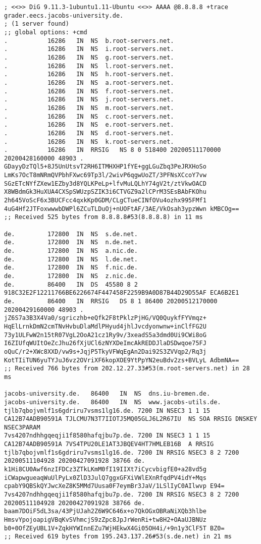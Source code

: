 \documentclass[a4paper]{article}
\begin{document}
\begin{verbatim}
; <<>> DiG 9.11.3-1ubuntu1.11-Ubuntu <<>> AAAA @8.8.8.8 +trace grader.eecs.jacobs-university.de.
; (1 server found)
;; global options: +cmd
.			16286	IN	NS	b.root-servers.net.
.			16286	IN	NS	i.root-servers.net.
.			16286	IN	NS	g.root-servers.net.
.			16286	IN	NS	l.root-servers.net.
.			16286	IN	NS	h.root-servers.net.
.			16286	IN	NS	a.root-servers.net.
.			16286	IN	NS	f.root-servers.net.
.			16286	IN	NS	j.root-servers.net.
.			16286	IN	NS	m.root-servers.net.
.			16286	IN	NS	c.root-servers.net.
.			16286	IN	NS	e.root-servers.net.
.			16286	IN	NS	d.root-servers.net.
.			16286	IN	NS	k.root-servers.net.
.			16286	IN	RRSIG	NS 8 0 518400 20200511170000 20200428160000 48903 . GDayyDzTQl5+8J5UnUtsvT2RH6ITMHXHP1fYE+ggLGuZbq3PeJRXHoSo LmKs7OcT8mNRmQVPbhFXwc69Tp3l/2wivP6qgwUoZT/3PFNsXCcoY7vw SGzETcNYfZXew1EZby3d8YQLKPeLp+lfvMuLQLhY74gV2t/ztVkwOACD X8WBdmGk3HuXUA4CXSpSWUzpSZIK3i6CTVGZ9a2lCPrM3SEsBAbFKOhu 2h645VoScF6x3BUCFcc4qxkKp0GDM/CLgCTueCINfOVu4ozhx995FMf1 4uG4Hf2JTFoxwwwbDWPl6ZCuTLDuOj+nUOFtAF/3AE/VkOsah3ypzWwn kMBCOg==
;; Received 525 bytes from 8.8.8.8#53(8.8.8.8) in 11 ms

de.			172800	IN	NS	s.de.net.
de.			172800	IN	NS	n.de.net.
de.			172800	IN	NS	a.nic.de.
de.			172800	IN	NS	l.de.net.
de.			172800	IN	NS	f.nic.de.
de.			172800	IN	NS	z.nic.de.
de.			86400	IN	DS	45580 8 2 918C32E2F12211766BE6226674F447458F2259B9A0D87B44D29D55AF ECA6B2E1
de.			86400	IN	RRSIG	DS 8 1 86400 20200512170000 20200429160000 48903 . jZ6S7a3B3X4Va0/sgriczhb+eQfk2F8tPklzPjHG/VQ0QuykfFYVmqz+ HqElLrnkDmN2cmTNvHvbuDlaMdlPHyud4jhlJvcdyonwnw+inClfFG2U 73y1ULFwW2n15tR07VgL2OoA21cz1Ry9v/3xeadS5a3dmd0Ui9CWi8oG I6ZIUfqWUItOeZcJhu26fXjUCl6zNYXDeImcAkREDDJlaDSDwqoe75FJ oQuC/r2+XWc8XXD/vw9s+JqjP5TkyVFWqEgAn2Dai92S3ZVVqp2/Rq3j KotTIiTUN6yuTYJuJ6vz2OVriXF6kopXOE9YtPpYN2euBdv2zs+BVLyL AdbmNA==
;; Received 766 bytes from 202.12.27.33#53(m.root-servers.net) in 28 ms

jacobs-university.de.	86400	IN	NS	dns.iu-bremen.de.
jacobs-university.de.	86400	IN	NS	www.jacobs-utils.de.
tjlb7qbojvmlf1s6gdriru7vsms1lg16.de. 7200 IN NSEC3 1 1 15 CA12B74ADB90591A TJLCMU7N3T7IIOTJ5MQ05GLJ6L2R67IU  NS SOA RRSIG DNSKEY NSEC3PARAM
7vs4207ndhhgqeqji1f8580hafqjbu7p.de. 7200 IN NSEC3 1 1 15 CA12B74ADB90591A 7VS4TPU20LE1AT3JBQEV4HT7HMLEB16B  A RRSIG
tjlb7qbojvmlf1s6gdriru7vsms1lg16.de. 7200 IN RRSIG NSEC3 8 2 7200 20200511104928 20200427091928 38766 de. k1Hi8CU0Awf6nzIFDCz3ZTkLKmM0fI19IIXt7iCycvbigfE0+a28vd5g iCWapwgueaqWuUlPyLx0ZlD3JulQ7ggxGFXiVWlEXnRfqdPV4idY+Mqs cpabY9QBSkQYJwcXeZ8K5MMd7Uusa0F7eymBr3JaV/1LSlIyC0AIlwvp E94=
7vs4207ndhhgqeqji1f8580hafqjbu7p.de. 7200 IN RRSIG NSEC3 8 2 7200 20200511104928 20200427091928 38766 de. baam7DOiF5dL3sa/43PjUJah2Z6W9C646x+o7QkOGxOBRaNiXQb3hlbe HmsvYpojoapigVBqKvSVhmcjS9zZpc8JpJrWenRi+tw8H2+OAaUJBNUz b0+0OfZEyUBL1V+ZqkHYWInnEZu7WjHEkwX4Gi05OH4i/+9n1y3ClF5T BZ0=
;; Received 619 bytes from 195.243.137.26#53(s.de.net) in 21 ms


\end{verbatim}
\end{document}
